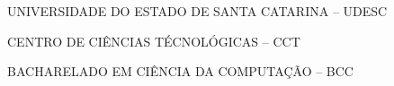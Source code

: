 

\renewcommand{\imprimircapa}{%
	\begin{capa}%
		\center

		{\fontseries{b}\selectfont\MakeTextUppercase{UNIVERSIDADE DO ESTADO DE SANTA CATARINA -- UDESC}}
		
		{\fontseries{b}\selectfont\MakeTextUppercase{CENTRO DE CIÊNCIAS TÉCNOLÓGICAS -- CCT  }}
		
		{\fontseries{b}\selectfont\MakeTextUppercase{BACHARELADO EM CIÊNCIA DA COMPUTAÇÃO -- BCC  }}
		
		\vfill
		
		{\fontseries{b}\selectfont\MakeTextUppercase{\normalsize\imprimirautor}}
		
		\vfill
		\begin{center}
			{\fontseries{b}\selectfont\MakeTextUppercase{\imprimirtitulo}}
		\end{center}
		\vfill
		
		\vfill
		
		{\fontseries{b}\selectfont\MakeTextUppercase{\imprimirlocal}}
		\par
		{\selectfont \imprimirdata}
		\vspace*{1cm}
	\end{capa}
}



\imprimircapa				%


